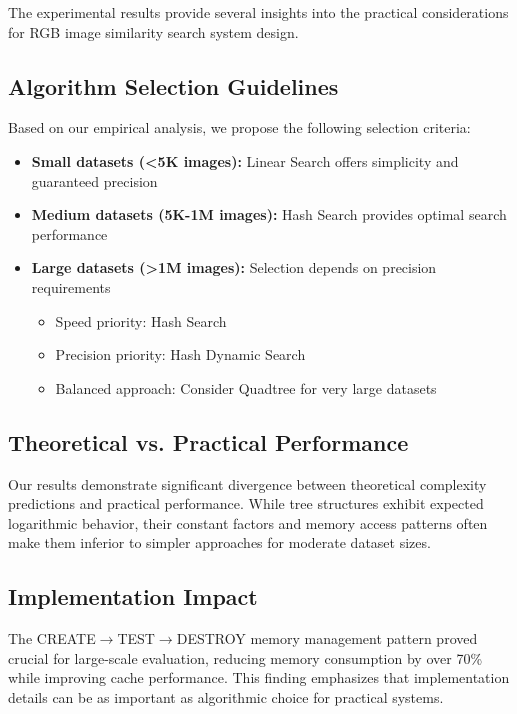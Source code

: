 \documentclass{sbc2023}
\begin{document}
The experimental results provide several insights into the practical considerations for RGB image similarity search system design.

\subsection{Algorithm Selection Guidelines}

Based on our empirical analysis, we propose the following selection criteria:

\begin{itemize}
    \item \textbf{Small datasets (<5K images):} Linear Search offers simplicity and guaranteed precision
    
    \item \textbf{Medium datasets (5K-1M images):} Hash Search provides optimal search performance
    
    \item \textbf{Large datasets (>1M images):} Selection depends on precision requirements
    \begin{itemize}
        \item Speed priority: Hash Search
        \item Precision priority: Hash Dynamic Search  
        \item Balanced approach: Consider Quadtree for very large datasets
    \end{itemize}
\end{itemize}

\subsection{Theoretical vs. Practical Performance}

Our results demonstrate significant divergence between theoretical complexity predictions and practical performance. While tree structures exhibit expected logarithmic behavior, their constant factors and memory access patterns often make them inferior to simpler approaches for moderate dataset sizes.

\subsection{Implementation Impact}

The CREATE$\rightarrow$TEST$\rightarrow$DESTROY memory management pattern proved crucial for large-scale evaluation, reducing memory consumption by over 70\% while improving cache performance. This finding emphasizes that implementation details can be as important as algorithmic choice for practical systems.
\end{document}
